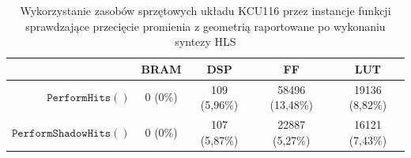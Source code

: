 \begin{enumerate}
\begin{table}[H]
\centering
\caption[Wykorzystanie zasobów sprzętowych układu KCU116 przez instancje funkcji sprawdzające przecięcie promienia z geometrią]{Wykorzystanie zasobów sprzętowych układu KCU116 przez instancje funkcji sprawdzające przecięcie promienia z geometrią raportowane po wykonaniu syntezy HLS}
\label{ch3:tab:perform_hits_util}
\begin{tabular}{|r|c|c|c|c|}
\hline
\multicolumn{1}{|l|}{}                  & \textbf{BRAM} & \textbf{DSP} & \textbf{FF}    & \textbf{LUT}   \\ \hline
\textbf{$\mathtt{PerformHits()}$}       & 0 (0\%)       & 109 (5,96\%) & 58496 (13,48\%) & 19136 (8,82\%) \\ \hline
\textbf{$\mathtt{PerformShadowHits()}$} & 0 (0\%)       & 107 (5,87\%) & 22887 (5,27\%) & 16121 (7,43\%) \\ \hline
\end{tabular}
\end{table}



\end{enumerate}
